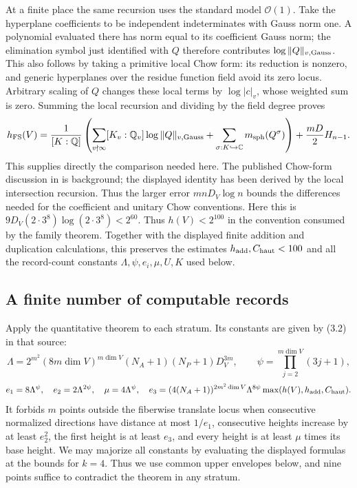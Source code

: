 At a finite place the same recursion uses the standard model
$\mathcal O(1)$.  Take the hyperplane coefficients to be independent
indeterminates with Gauss norm one.  A polynomial evaluated there
has norm equal to its coefficient Gauss norm; the elimination symbol
just identified with $Q$ therefore contributes
$\log\|Q\|_{v,\rm Gauss}$.  This also follows by taking a primitive
local Chow form: its reduction is nonzero, and generic hyperplanes
over the residue function field avoid its zero locus.  Arbitrary
scaling of $Q$ changes these local terms by $\log|c|_v$, whose weighted
sum is zero.  Summing the local recursion and dividing by the field
degree proves
\[
 h_{\rm FS}(V)=\frac1{[K:\mathbb Q]}
 \left(\sum_{v\nmid\infty}[K_v:\mathbb Q_v]
       \log\|Q\|_{v,\rm Gauss}
 +\sum_{\sigma:K\hookrightarrow\mathbb C}
       m_{\rm sph}(Q^\sigma)\right)+\frac{mD}{2}H_{n-1}.
\]
This supplies directly the comparison needed here.  The published
Chow-form discussion in \cite[Section~4.3.4.1]{q198bb:BGS} is background;
the displayed identity has been derived by the local intersection recursion.
Thus the larger error
$mnD_V\log n$ bounds the differences needed for the coefficient and
unitary Chow conventions.  Here this is
$9D_V(2\cdot3^8)\log(2\cdot3^8)<2^{60}$.
Thus $h(V)<2^{100}$ in the convention consumed by the family theorem.
Together with the displayed finite addition and duplication calculations,
this preserves the estimates $h_{\rm add},C_{\rm haut}<100$ and all
the record-count constants $\Lambda,\psi,e_i,\mu,U,K$ used below.




\subsection{A finite number of computable records}
\label{q198bb:records}
Apply the quantitative theorem \cite[Theorem~3.1, p.~312]{q198bb:VB}
to each stratum. Its constants are given by (3.2) in that source:
\[
 \Lambda=2^{m^2}(8m\dim V)^{m\dim V}(N_A+1)(N_P+1)D_V^{3m},
 \qquad \psi=\prod_{j=2}^{m\dim V}(3j+1),
\]
\[
 e_1=8\Lambda^\psi,\quad e_2=2\Lambda^{2\psi},\quad
 \mu=4\Lambda^\psi,\quad
 e_3=(4(N_A+1))^{2m^2\dim V}\Lambda^{8\psi}
                  \max(h(V),h_{\rm add},C_{\rm haut}).
\]
It forbids $m$ points outside the fiberwise translate locus when
consecutive normalized directions have distance at most $1/e_1$,
consecutive heights increase by at least $e_2^2$, the first height is
at least $e_3$, and every height is at least $\mu$ times its base height.
We may majorize all constants by evaluating the displayed formulas at
the bounds for $k=4$. Thus we use common upper envelopes below, and
nine points suffice to contradict the theorem in any stratum.

